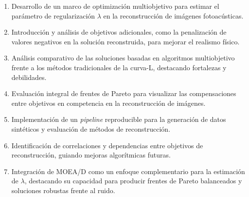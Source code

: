 \begin{enumerate}[start=1,label={C\arabic*:},wide = 0pt, leftmargin = 3em]
    \item Desarrollo de un marco de optimización multiobjetivo para estimar el parámetro de regularización \( \lambda \) en la reconstrucción de imágenes fotoacústicas.
    \item Introducción y análisis de objetivos adicionales, como la penalización de valores negativos en la solución reconstruida, para mejorar el realismo físico.
    \item Análisis comparativo de las soluciones basadas en algoritmos multiobjetivo frente a los métodos tradicionales de la curva-L, destacando fortalezas y debilidades.
    \item Evaluación integral de frentes de Pareto para visualizar las compensaciones entre objetivos en competencia en la reconstrucción de imágenes.
    \item Implementación de un \textit{pipeline} reproducible para la generación de datos sintéticos y evaluación de métodos de reconstrucción.
    \item Identificación de correlaciones y dependencias entre objetivos de reconstrucción, guiando mejoras algorítmicas futuras.
    \item Integración de MOEA/D como un enfoque complementario para la estimación de \( \lambda \), destacando su capacidad para producir frentes de Pareto balanceados y soluciones robustas frente al ruido.
\end{enumerate}
